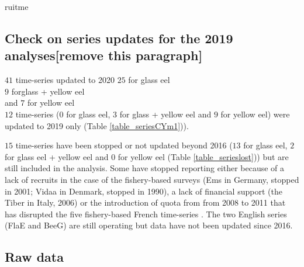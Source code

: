 ruitme\documentclass[pdftex,11pt,a4paper]{report}
\begin{document}

\subsection{Check on series updates for the 2019 analyses[remove this paragraph]}

$41$ time-series  updated to 2020 
$25$ for glass eel \\ 
$9$ forglass + yellow eel  \\
and $7$ for yellow eel \\
$12$ time-series (0 for glass eel,
$3$ for glass + yellow eel and
$9$ for yellow eel) were updated to 2019
only (Table \ref{table_seriesCYm1})).  

$15$ time-series have been stopped or not updated
beyond 2016 ($13$ for glass eel,
$2$ for glass eel + yellow eel and
0 for yellow eel (Table
\ref{table_serieslost})) but are still included in the analysis.
Some have stopped reporting either because of a lack of recruits in the case of
the fishery-based surveys (Ems in Germany, stopped in 2001; Vidaa in Denmark, stopped in 1990),
 a lack of financial support (the Tiber in Italy, 2006) or the introduction of
quota from from 2008 to 2011 that has disrupted the five fishery-based French
time-series . The two English series (FlaE and BeeG) are still operating but
data have not been updated since 2016.


	

	

	


\setlength{\tabcolsep}{4pt} %

\subsection{Raw data}
 
\end{document}

